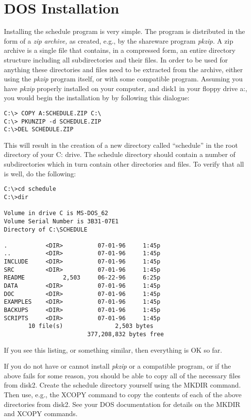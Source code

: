 \section{DOS Installation}
Installing the schedule program is very simple. The program is distributed
in the form of a {\it zip archive,} as created, e.g., by the shareware
program {\it pkzip.} A zip archive is a single file that contains, in
a compressed form, an entire directory structure including all subdirectories
and their files. In order to be used for anything these directories and
files need to be extracted from the archive, either using the {\it pkzip}
program itself, or with some compatible program. Assuming you have
{\it pkzip} properly installed on your computer, and  disk1
in your floppy drive a:, you would begin the
installation by by following this dialogue: \smallskip
\begin{verbatim}C:\> COPY A:SCHEDULE.ZIP C:\
C:\> PKUNZIP -d SCHEDULE.ZIP
C:\>DEL SCHEDULE.ZIP
\end{verbatim}
\smallskip
This will result in the creation of a new directory called ``schedule''
in the root directory of your C: drive. The schedule directory should
contain a number of subdirectories which in turn contain other directories
and files. To verify that all is well, do the following: \smallskip
\begin{verbatim}
C:\>cd schedule
C:\>dir

Volume in drive C is MS-DOS_62
Volume Serial Number is 3B31-07E1
Directory of C:\SCHEDULE

.           <DIR>          07-01-96     1:45p
..          <DIR>          07-01-96     1:45p
INCLUDE     <DIR>          07-01-96     1:45p
SRC         <DIR>          07-01-96     1:45p
README           2,503     06-22-96     6:25p
DATA        <DIR>          07-01-96     1:45p
DOC         <DIR>          07-01-96     1:45p
EXAMPLES    <DIR>          07-01-96     1:45p
BACKUPS     <DIR>          07-01-96     1:45p
SCRIPTS     <DIR>          07-01-96     1:45p
       10 file(s)               2,503 bytes
                        377,208,832 bytes free
\end{verbatim}
\smallskip 
If you see this listing, or something similar, then everything is OK so far.

If you do not have or cannot install {\it pkzip} or a compatible program, or
if the above fails for some reason, you should be able to copy all of the
necessary files from disk2. Create the schedule 
directory yourself using the MKDIR command. Then use, e.g., the XCOPY
command to copy the contents of each of the above directories from 
disk2. See your DOS documentation for details on the MKDIR
and XCOPY commands.

